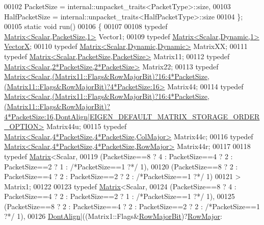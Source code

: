 \begin{DoxyCode}
00102     PacketSize = internal::unpacket\_traits<PacketType>::size,
00103     HalfPacketSize = internal::unpacket\_traits<HalfPacketType>::size
00104   \};
00105   \textcolor{keyword}{static} \textcolor{keywordtype}{void} run()
00106   \{
00107     
00108     \textcolor{keyword}{typedef} \hyperlink{group___core___module_class_eigen_1_1_matrix}{Matrix<Scalar,PacketSize,1>} Vector1;
00109     \textcolor{keyword}{typedef} \hyperlink{group___core___module}{Matrix<Scalar,Dynamic,1>} \hyperlink{group___core___module}{VectorX};
00110     \textcolor{keyword}{typedef} \hyperlink{group___core___module}{Matrix<Scalar,Dynamic,Dynamic>} MatrixXX;
00111     \textcolor{keyword}{typedef} \hyperlink{group___core___module_class_eigen_1_1_matrix}{Matrix<Scalar,PacketSize,PacketSize>} Matrix11;
00112     \textcolor{keyword}{typedef} \hyperlink{group___core___module_class_eigen_1_1_matrix}{Matrix<Scalar,2*PacketSize,2*PacketSize>} Matrix22;
00113     \textcolor{keyword}{typedef} 
      \hyperlink{group___core___module_class_eigen_1_1_matrix}{Matrix<Scalar,(Matrix11::Flags&RowMajorBit)?16:4*PacketSize,(Matrix11::Flags&RowMajorBit)?4*PacketSize:16>}
       Matrix44;
00114     \textcolor{keyword}{typedef} 
      \hyperlink{group___core___module_class_eigen_1_1_matrix}{
      Matrix<Scalar,(Matrix11::Flags&RowMajorBit)?16:4*PacketSize,(Matrix11::Flags&RowMajorBit)?4*PacketSize:16,DontAlign|EIGEN\_DEFAULT\_MATRIX\_STORAGE\_ORDER\_OPTION>}
       Matrix44u;
00115     \textcolor{keyword}{typedef} \hyperlink{group___core___module_class_eigen_1_1_matrix}{Matrix<Scalar,4*PacketSize,4*PacketSize,ColMajor>}
       Matrix44c;
00116     \textcolor{keyword}{typedef} \hyperlink{group___core___module_class_eigen_1_1_matrix}{Matrix<Scalar,4*PacketSize,4*PacketSize,RowMajor>}
       Matrix44r;
00117 
00118     \textcolor{keyword}{typedef} \hyperlink{group___core___module_class_eigen_1_1_matrix}{Matrix}<Scalar,
00119         (PacketSize==8 ? 4 : PacketSize==4 ? 2 : PacketSize==2 ? 1 : \textcolor{comment}{/*PacketSize==1 ?*/} 1),
00120         (PacketSize==8 ? 2 : PacketSize==4 ? 2 : PacketSize==2 ? 2 : \textcolor{comment}{/*PacketSize==1 ?*/} 1)
00121       > Matrix1;
00122 
00123     \textcolor{keyword}{typedef} \hyperlink{group___core___module_class_eigen_1_1_matrix}{Matrix}<Scalar,
00124         (PacketSize==8 ? 4 : PacketSize==4 ? 2 : PacketSize==2 ? 1 : \textcolor{comment}{/*PacketSize==1 ?*/} 1),
00125         (PacketSize==8 ? 2 : PacketSize==4 ? 2 : PacketSize==2 ? 2 : \textcolor{comment}{/*PacketSize==1 ?*/} 1),
00126       \hyperlink{group__enums_ggaacded1a18ae58b0f554751f6cdf9eb13a40a452614141522dd313363dbbd65726}{DontAlign}|((Matrix1::Flags&\hyperlink{group__flags_gae4f56c2a60bbe4bd2e44c5b19cbe8762}{RowMajorBit})?\hyperlink{group__enums_ggaacded1a18ae58b0f554751f6cdf9eb13acfcde9cd8677c5f7caf6bd603666aae3}{RowMajor}:

\end{DoxyCode}
